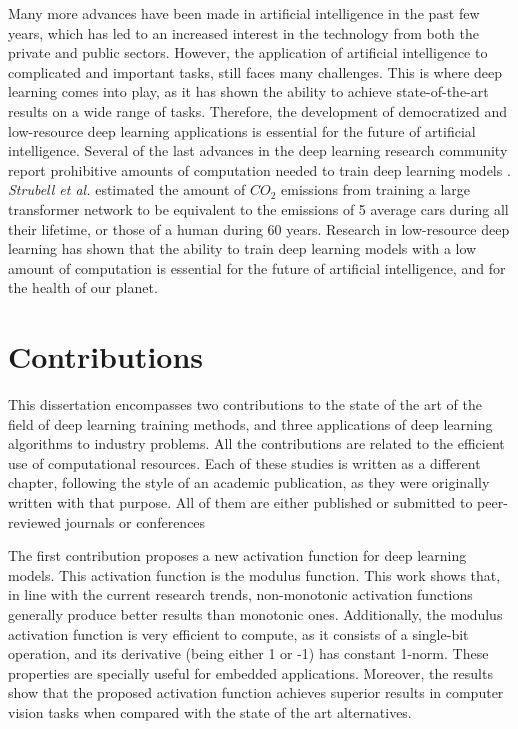 Many more advances have been made in artificial intelligence in the past few years, which has led to an increased interest in the technology from both the private and public sectors. However, the application of artificial intelligence to complicated and important tasks, still faces many challenges. This is where deep learning comes into play, as it has shown the ability to achieve state-of-the-art results on a wide range of tasks. Therefore, the development of democratized and low-resource deep learning applications is essential for the future of artificial intelligence. Several of the last advances in the deep learning research community report prohibitive amounts of computation needed to train deep learning models \autocite{silver2016, kechyn2018, brown2020, floridi2020}. \textit{Strubell et al.} \autocite{strubell2019} estimated the amount of $CO_2$ emissions from training a large transformer network to be equivalent to the emissions of 5 average cars during all their lifetime, or those of a human during 60 years. Research in low-resource deep learning \autocite{howard2017, Han2017, Gao2018, sanchez2020, so2021} has shown that the ability to train deep learning models with a low amount of computation is essential for the future of artificial intelligence, and for the health of our planet.


\section{Contributions}
This dissertation encompasses two contributions to the state of the art of the field of deep learning training methods, and three applications of deep learning algorithms to industry problems. All the contributions are related to the efficient use of computational resources. Each of these studies is written as a different chapter, following the style of an academic publication, as they were originally written with that purpose. All of them are either published or submitted to peer-reviewed journals or conferences

The first contribution proposes a new activation function for deep learning models. This activation function is the modulus function. This work shows that, in line with the current research trends, non-monotonic activation functions generally produce better results than monotonic ones. Additionally, the modulus activation function is very efficient to compute, as it consists of a single-bit operation, and its derivative (being either 1 or -1) has constant 1-norm. These properties are specially useful for embedded applications. Moreover, the results show that the proposed activation function achieves superior results in computer vision tasks when compared with the state of the art alternatives.

